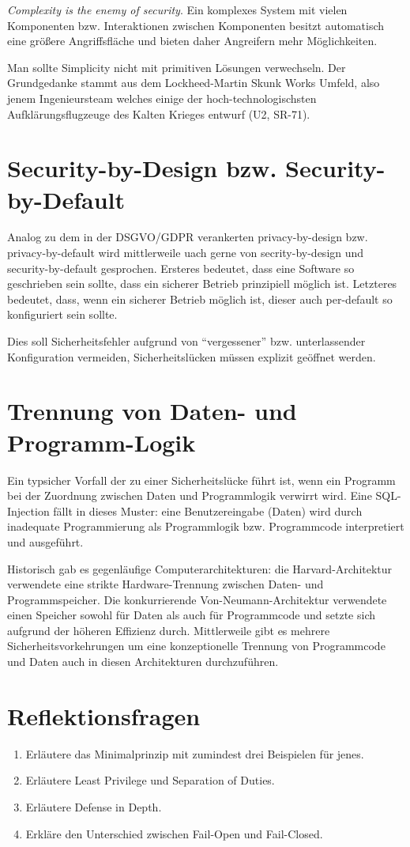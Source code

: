 \textit{Complexity is the enemy of security}. Ein komplexes System mit vielen Komponenten bzw. Interaktionen zwischen Komponenten besitzt automatisch eine größere Angriffsfläche und bieten daher Angreifern mehr Möglichkeiten.

Man sollte Simplicity nicht mit primitiven Lösungen verwechseln. Der Grundgedanke stammt aus dem Lockheed-Martin Skunk Works Umfeld, also jenem Ingenieursteam welches einige der hoch-technologischsten Aufklärungsflugzeuge des Kalten Krieges entwurf (U2, SR-71).

\section{Security-by-Design bzw. Security-by-Default}

Analog zu dem in der DSGVO/GDPR verankerten privacy-by-design bzw. privacy-by-default wird mittlerweile uach gerne von secrity-by-design und security-by-default gesprochen. Ersteres bedeutet, dass eine Software so geschrieben sein sollte, dass ein sicherer Betrieb prinzipiell möglich ist. Letzteres bedeutet, dass, wenn ein sicherer Betrieb möglich ist, dieser auch per-default so konfiguriert sein sollte.

Dies soll Sicherheitsfehler aufgrund von ``vergessener'' bzw. unterlassender Konfiguration vermeiden, Sicherheitslücken müssen explizit geöffnet werden.

\section{Trennung von Daten- und Programm-Logik}

Ein typsicher Vorfall der zu einer Sicherheitslücke führt ist, wenn ein Programm bei der Zuordnung zwischen Daten und Programmlogik verwirrt wird. Eine SQL-Injection fällt in dieses Muster: eine Benutzereingabe (Daten) wird durch inadequate Programmierung als Programmlogik bzw. Programmcode interpretiert und ausgeführt.

Historisch gab es gegenläufige Computerarchitekturen: die Harvard-Architektur verwendete eine strikte Hardware-Trennung zwischen Daten- und Programmspeicher. Die konkurrierende Von-Neumann-Architektur verwendete einen Speicher sowohl für Daten als auch für Programmcode und setzte sich aufgrund der höheren Effizienz durch. Mittlerweile gibt es mehrere Sicherheitsvorkehrungen um eine konzeptionelle Trennung von Programmcode und Daten auch in diesen Architekturen durchzuführen.

\section{Reflektionsfragen}

\begin{enumerate}
	\item Erläutere das Minimalprinzip mit zumindest drei Beispielen für jenes.
	\item Erläutere Least Privilege und Separation of Duties.
	\item Erläutere Defense in Depth.
	\item Erkläre den Unterschied zwischen Fail-Open und Fail-Closed.
\end{enumerate}
